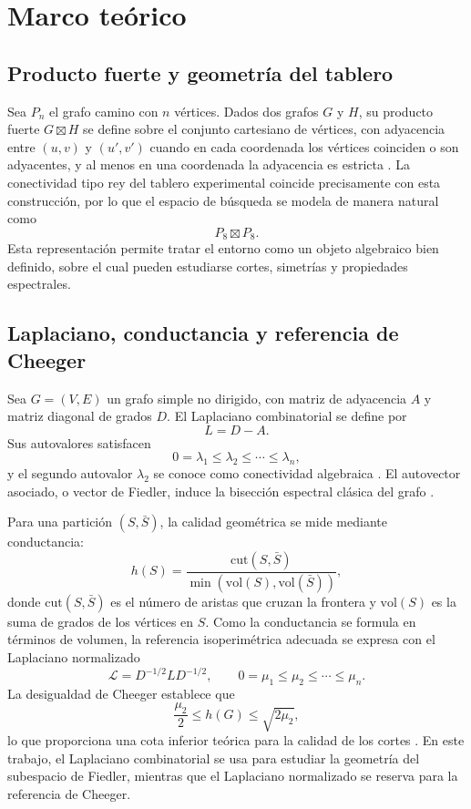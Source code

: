 \documentclass[journal]{IEEEtran}
\newcommand{\vol}{\mathrm{vol}}
\newcommand{\cut}{\mathrm{cut}}
\begin{document}
\section{Marco teórico}

\subsection{Producto fuerte y geometría del tablero}

Sea $P_n$ el grafo camino con $n$ vértices. Dados dos grafos $G$ y $H$, su producto fuerte $G \boxtimes H$ se define sobre el conjunto cartesiano de vértices, con adyacencia entre $(u,v)$ y $(u',v')$ cuando en cada coordenada los vértices coinciden o son adyacentes, y al menos en una coordenada la adyacencia es estricta \cite{hammack2011}. La conectividad tipo rey del tablero experimental coincide precisamente con esta construcción, por lo que el espacio de búsqueda se modela de manera natural como
\[
P_8 \boxtimes P_8.
\]
Esta representación permite tratar el entorno como un objeto algebraico bien definido, sobre el cual pueden estudiarse cortes, simetrías y propiedades espectrales.

\subsection{Laplaciano, conductancia y referencia de Cheeger}

Sea $G=(V,E)$ un grafo simple no dirigido, con matriz de adyacencia $A$ y matriz diagonal de grados $D$. El Laplaciano combinatorial se define por
\[
L=D-A.
\]
Sus autovalores satisfacen
\[
0=\lambda_1 \le \lambda_2 \le \cdots \le \lambda_n,
\]
y el segundo autovalor $\lambda_2$ se conoce como conectividad algebraica \cite{fiedler1973,mohar1991}. El autovector asociado, o vector de Fiedler, induce la bisección espectral clásica del grafo \cite{chung1997,vonluxburg2007}.

Para una partición $(S,\bar S)$, la calidad geométrica se mide mediante conductancia:
\begin{equation}
h(S)=\frac{\cut(S,\bar S)}{\min(\vol(S),\vol(\bar S))},
\end{equation}
donde $\cut(S,\bar S)$ es el número de aristas que cruzan la frontera y $\vol(S)$ es la suma de grados de los vértices en $S$. Como la conductancia se formula en términos de volumen, la referencia isoperimétrica adecuada se expresa con el Laplaciano normalizado
\[
\mathcal{L}=D^{-1/2}LD^{-1/2}, \qquad 0=\mu_1 \le \mu_2 \le \cdots \le \mu_n.
\]
La desigualdad de Cheeger establece que
\begin{equation}
\frac{\mu_2}{2} \le h(G) \le \sqrt{2\mu_2},
\end{equation}
lo que proporciona una cota inferior teórica para la calidad de los cortes \cite{chung1997,cheeger1970}. En este trabajo, el Laplaciano combinatorial se usa para estudiar la geometría del subespacio de Fiedler, mientras que el Laplaciano normalizado se reserva para la referencia de Cheeger.
\end{document}
